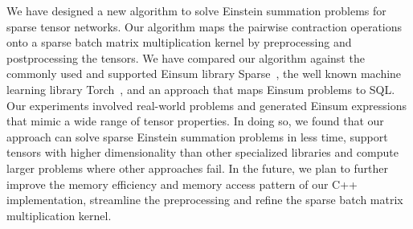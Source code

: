 We have designed a new algorithm to solve Einstein summation problems for sparse tensor networks.
Our algorithm maps the pairwise contraction operations onto a sparse batch matrix multiplication kernel
by preprocessing and postprocessing the tensors. We have compared our algorithm against the commonly used
and supported Einsum library Sparse~\cite{sparse}, the well known machine learning library
Torch~\cite{pytorch}, and an approach that maps Einsum problems to SQL. Our experiments involved
real-world problems and generated Einsum expressions that mimic a wide range of tensor properties.
In doing so, we found that our approach can solve sparse Einstein summation problems in less time,
support tensors with higher dimensionality than other specialized libraries and compute larger problems
where other approaches fail. In the future, we plan to further improve the memory efficiency and
memory access pattern of our C++ implementation, streamline the preprocessing and refine the
sparse batch matrix multiplication kernel.